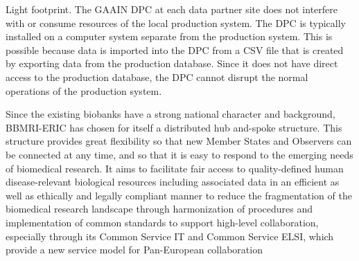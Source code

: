 Light footprint. The GAAIN DPC at each data partner site does not interfere with or
consume resources of the local production system.  The DPC is typically installed on a
computer system separate from the production system. This is possible because data is
imported into the DPC from a CSV file that is created by exporting data from the
production database. Since it does not have direct access to the production database,
the DPC cannot disrupt the normal operations of the production system.




\cite{datasphere}
\cite{ehr4cr}
\cite{popmednet}
\cite{gaain}

\cite{bbmieric} Since the existing biobanks have a strong national character and background, BBMRI-ERIC has chosen for itself a distributed hub and-spoke structure. This structure provides great flexibility so that new Member States and Observers can be connected at any time, and so that it is easy to respond to the emerging needs of biomedical research. It aims to facilitate fair access to quality-defined human disease-relevant biological resources including associated data in an efficient as well as ethically and legally compliant manner to reduce the fragmentation of the biomedical research landscape through harmonization of procedures and implementation of common standards to support high-level collaboration, especially through its Common Service IT and Common Service ELSI, which provide a new service model for Pan-European collaboration

